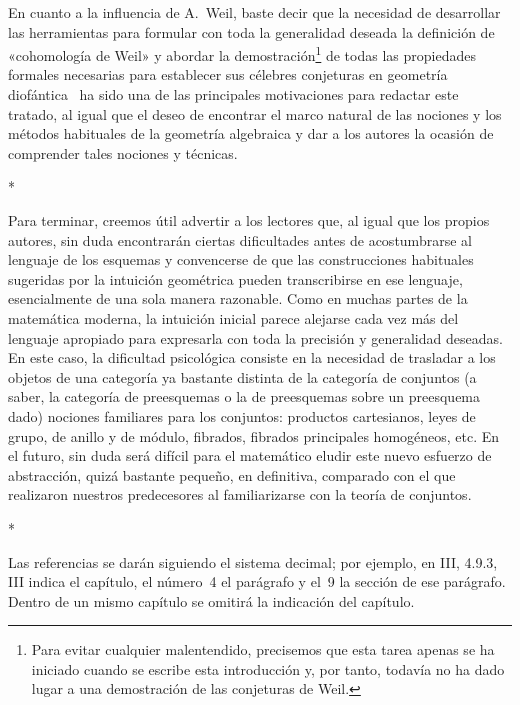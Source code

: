En cuanto a la influencia de A.~Weil, baste decir que la necesidad de desarrollar las herramientas para formular con toda la generalidad deseada la definición de «cohomología de Weil» y abordar la demostración\footnote{Para evitar cualquier malentendido, precisemos que esta tarea apenas se ha iniciado cuando se escribe esta introducción y, por tanto, todavía no ha dado lugar a una demostración de las conjeturas de Weil.} de todas las propiedades formales necesarias para establecer sus célebres conjeturas en geometría diofántica~\cite{I-19} ha sido una de las principales motivaciones para redactar este tratado, al igual que el deseo de encontrar el marco natural de las nociones y los métodos habituales de la geometría algebraica y dar a los autores la ocasión de comprender tales nociones y técnicas.

\bigskip
\begin{center}*\quad*\quad*\end{center}
\bigskip

Para terminar, creemos útil advertir a los lectores que, al igual que los propios autores, sin duda encontrarán ciertas dificultades antes de acostumbrarse al lenguaje de los esquemas y convencerse de que las construcciones habituales sugeridas por la intuición geométrica pueden transcribirse en ese lenguaje, esencialmente de una sola manera razonable.
Como en muchas partes de la matemática moderna, la intuición inicial parece alejarse cada vez más del lenguaje apropiado para expresarla con toda la precisión y generalidad deseadas.
En este caso, la dificultad psicológica consiste en la necesidad de trasladar a los objetos de una categoría ya bastante distinta de la categoría de conjuntos (a saber, la categoría de preesquemas o la de preesquemas sobre un preesquema dado) nociones familiares para los conjuntos: productos cartesianos, leyes de grupo, de anillo y de módulo, fibrados, fibrados principales homogéneos, etc.
En el futuro, sin duda será difícil para el matemático eludir este nuevo esfuerzo de abstracción, quizá bastante pequeño, en definitiva, comparado con el que realizaron nuestros predecesores al familiarizarse con la teoría de conjuntos.

\bigskip
\begin{center}*\quad*\quad*\end{center}
\bigskip

Las referencias se darán siguiendo el sistema decimal; por ejemplo, en III, 4.9.3, III indica el capítulo, el número~4 el parágrafo y el~9 la sección de ese parágrafo.
Dentro de un mismo capítulo se omitirá la indicación del capítulo.

